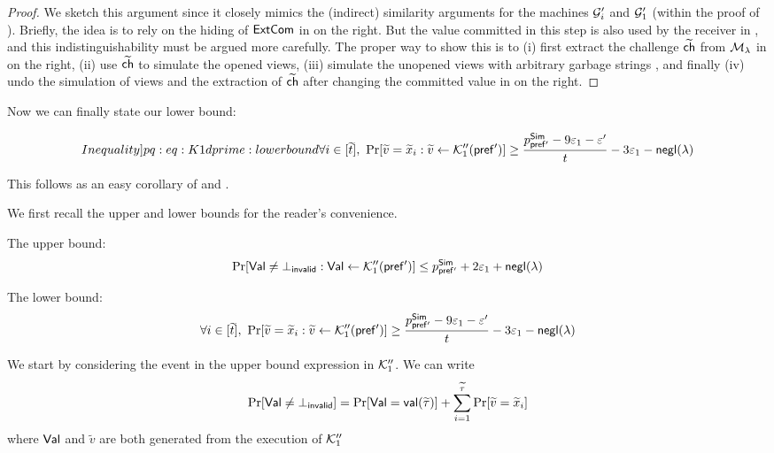 \begin{proof}
We sketch this argument since it closely mimics the (indirect) similarity arguments for the machines $\mathcal{G}_i'$ and $\mathcal{G}_1'$ (within the proof of ). Briefly, the idea is to rely on the hiding of $\mathsf{ExtCom}$ in  on the right. But the value committed in this step is also used by the receiver in , and this indistinguishability must be argued more carefully. The proper way to show this is to (i) first extract the challenge $\widetilde{\mathsf{ch}}$ from $\mathcal{M}_\lambda$ in  on the right, (ii) use $\widetilde{\mathsf{ch}}$ to simulate the opened views, (iii) simulate the unopened views with arbitrary garbage strings , and finally (iv) undo the simulation of views and the extraction of $\widetilde{\mathsf{ch}}$ after changing the committed value in  on the right. 

\end{proof}


Now we can finally state our lower bound: 

\begin{equation}\label[Inequality]{pq:eq:K1dprime:lowerbound}
\forall i \in [\tilde{t}],~\Pr[\tilde{v} = \tilde{x}_i: \tilde{v} \gets \mcal{K}_1''(\msf{pref'})] \geq \frac{p^{\msf{Sim}}_{\msf{pref'}} - 9\epsilon_1 - \epsilon'}{t} -3\epsilon_1 -\negl(\secpar)
\end{equation}

This follows as an easy corollary of  and . 


 We first recall the upper and lower bounds for the reader's convenience. 

The upper bound: $$\Pr[\mathsf{Val} \neq \bot_\mathsf{invalid}: \mathsf{Val} \gets \mathcal{K}_1''(\mathsf{pref'})] \leq p^{\mathsf{Sim}}_{\mathsf{pref'}} + 2\varepsilon_1 +\mathsf{negl}(\lambda)$$ 

The lower bound: $$\forall i \in [\widetilde{t}],~\Pr[\widetilde{v} = \widetilde{x}_i: \widetilde{v} \gets \mathcal{K}_1''(\mathsf{pref'})] \geq \frac{p^{\mathsf{Sim}}_{\mathsf{pref'}} - 9\varepsilon_1 - \varepsilon'}{t} -3\varepsilon_1 -\mathsf{negl}(\lambda)$$

We start by considering the event in the upper bound expression in $\mathcal{K}_1''$. We can write $$\Pr[\mathsf{Val} \neq \bot_{\mathsf{invalid}}] = \Pr[\mathsf{Val} = \mathsf{val}(\widetilde{\tau})] + \sum^{\widetilde{\tau}}_{i = 1}\Pr[\widetilde{v} = \widetilde{x}_i]$$ where $\mathsf{Val}$ and $\tilde{v}$ are both generated from the execution of $\mathcal{K}_1''$ 

